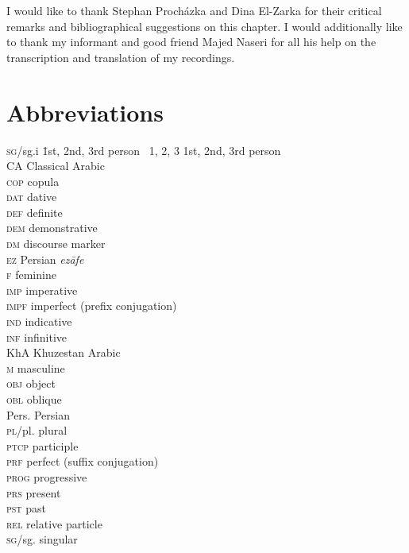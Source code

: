 \documentclass[output=paper,nonflat]{langsci/langscibook}
\begin{document}
I would like to thank Stephan Procházka and Dina El-Zarka for their critical remarks and bibliographical suggestions on this chapter. I would additionally like to thank my informant and good friend Majed Naseri for all his help on the transcription and translation of my recordings.

\section*{Abbreviations}
\begin{multicols}{2}
\begin{tabbing}
\textsc{sg}/sg.i \= 1st, 2nd, 3rd person~\kill
\textsc{1, 2, 3} \> 1st, 2nd, 3rd person \\
CA \> Classical Arabic\\
\textsc{cop} \> {copula}\\
\textsc{dat} \> dative\\
\textsc{def} \> {definite}\\
\textsc{dem} \> demonstrative\\
\textsc{dm} \> discourse marker\\
\textsc{ez} \> Persian \textit{ezāfe}\\
\textsc{f} \> feminine\\
\textsc{imp} \> imperative\\
\textsc{impf} \> imperfect  (prefix conjugation)\\
\textsc{ind} \> indicative\\
\textsc{inf} \> {infinitive}\\
KhA \> Khuzestan Arabic\\
\textsc{m} \> masculine\\
\textsc{obj} \> object\\
\textsc{obl} \> oblique\\
{Pers.} \> Persian\\
\textsc{pl}/pl. \> plural\\
\textsc{ptcp} \> {participle}\\
\textsc{prf} \> perfect (suffix conjugation)\\
\textsc{prog} \> progressive\\
\textsc{prs} \> present\\
\textsc{pst} \> past\\
\textsc{rel} \> {relative} particle\\
\textsc{sg}/sg. \> singular
\end{tabbing}%
\end{multicols}

{\sloppy\printbibliography[heading=subbibliography,notkeyword=this]}
\end{document}
